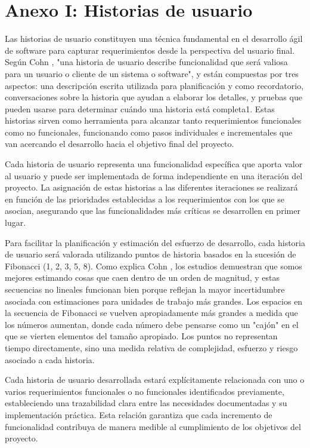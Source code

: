\section*{Anexo I: Historias de usuario}

Las historias de usuario constituyen una técnica fundamental en el desarrollo ágil de software para capturar requerimientos desde la perspectiva del usuario final. Según Cohn \cite{Cohn2004}, "una historia de usuario describe funcionalidad que será valiosa para un usuario o cliente de un sistema o software", y están compuestas por tres aspectos: una descripción escrita utilizada para planificación y como recordatorio, conversaciones sobre la historia que ayudan a elaborar los detalles, y pruebas que pueden usarse para determinar cuándo una historia está completa1. Estas historias sirven como herramienta para alcanzar tanto requerimientos funcionales como no funcionales, funcionando como pasos individuales e incrementales que van acercando el desarrollo hacia el objetivo final del proyecto.

Cada historia de usuario representa una funcionalidad específica que aporta valor al usuario y puede ser implementada de forma independiente en una iteración del proyecto. La asignación de estas historias a las diferentes iteraciones se realizará en función de las prioridades establecidas a los requerimientos con los que se asocian, asegurando que las funcionalidades más críticas se desarrollen en primer lugar.

Para facilitar la planificación y estimación del esfuerzo de desarrollo, cada historia de usuario será valorada utilizando puntos de historia basados en la sucesión de Fibonacci (1, 2, 3, 5, 8). Como explica Cohn \cite{Cohn2005}, los estudios demuestran que somos mejores estimando cosas que caen dentro de un orden de magnitud, y estas secuencias no lineales funcionan bien porque reflejan la mayor incertidumbre asociada con estimaciones para unidades de trabajo más grandes. Los espacios en la secuencia de Fibonacci se vuelven apropiadamente más grandes a medida que los números aumentan, donde cada número debe pensarse como un "cajón" en el que se vierten elementos del tamaño apropiado. Los puntos no representan tiempo directamente, sino una medida relativa de complejidad, esfuerzo y riesgo asociado a cada historia.

Cada historia de usuario desarrollada estará explícitamente relacionada con uno o varios requerimientos funcionales o no funcionales identificados previamente, estableciendo una trazabilidad clara entre las necesidades documentadas y su implementación práctica. Esta relación garantiza que cada incremento de funcionalidad contribuya de manera medible al cumplimiento de los objetivos del proyecto.

